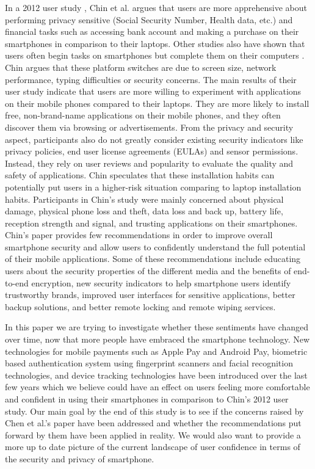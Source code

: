 \documentclass{sigchi}
\begin{document}
In a 2012 user study \cite{chin2012measuring}, Chin et al. argues that users are more apprehensive about performing privacy sensitive (Social Security Number, Health data, etc.) and financial tasks such as accessing bank account and making a purchase on their smartphones in comparison to their laptops. Other studies also have shown that users often begin tasks on smartphones but complete them on their computers \cite{bao2011smart} \cite{karlson2009working} \cite{matthews2009no}. Chin argues that these platform switches are due to screen size, network performance, typing difficulties or  security concerns. The main results of their user study indicate that users are more willing to experiment with applications on their mobile phones compared to their laptops. They are more likely to install free, non-brand-name applications on their mobile phones, and they often discover them via browsing or advertisements. From the privacy and security aspect, participants also do not greatly consider existing security indicators like privacy policies, end user license agreements (EULAs) and sensor permissions. Instead, they rely on user reviews and popularity to evaluate the quality and safety of applications. Chin speculates that these installation habits can potentially put users in a higher-risk situation comparing to laptop installation habits. Participants in Chin's study were mainly concerned about physical damage, physical phone loss and theft, data loss and back up, battery life, reception strength and signal, and trusting applications on their smartphones. Chin's paper provides few recommendations in order to improve overall smartphone security and allow users to confidently understand the full potential of their mobile applications. Some of these recommendations include educating users about the security properties of the different media and the benefits of end-to-end encryption, new security indicators to help smartphone users identify trustworthy brands, improved user interfaces for sensitive applications, better backup solutions, and better remote locking and remote wiping services. 

In this paper we are trying to investigate whether these sentiments have changed over time, now that more people have embraced the smartphone technology. New technologies for mobile payments such as Apple Pay and Android Pay, biometric based authentication system using fingerprint scanners and facial recognition technologies, and device tracking technologies have been introduced over the last few years which we believe could have an effect on users feeling more comfortable and confident in using their smartphones in comparison to Chin's 2012 user study. Our main goal by the end of this study is to see if the concerns raised by Chen et al.'s paper have been addressed and whether the recommendations put forward by them have been applied in reality. We would also want to provide a more up to date picture of the current landscape of user confidence in terms of the security and privacy of smartphone.
\end{document}
